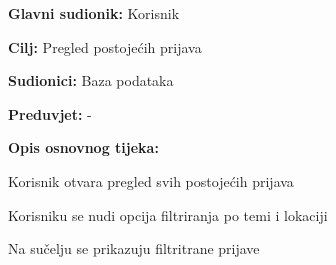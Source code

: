 					\noindent {}
					\begin{packed_item}
	
						\item \textbf{Glavni sudionik: }Korisnik
						\item  \textbf{Cilj:} Pregled postojećih prijava
						\item  \textbf{Sudionici:} Baza podataka
						\item  \textbf{Preduvjet:} -
						\item  \textbf{Opis osnovnog tijeka:}
						
						\item[] \begin{packed_enum}
	
							\item Korisnik otvara pregled svih postojećih prijava
							\item Korisniku se nudi opcija filtriranja po temi i lokaciji
							\item Na sučelju se prikazuju filtritrane prijave
						\end{packed_enum}
					\end{packed_item}
					
